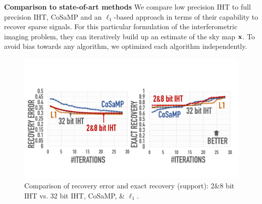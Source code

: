 \documentclass{article}
\begin{document}
{%


{\bf Comparison to state-of-art methods}
We compare low precision IHT to full precision IHT, CoSaMP and an $\ell_1$-based approach in terms of their capability to recover sparse signals. For this particular formulation of the interferometric imaging problem, they can iteratively build up an estimate of the sky map ${\bf x}$. To avoid bias towards any algorithm, we optimized each algorithm independently.

\begin{figure}[t]
\centering
\includegraphics[width=1\columnwidth, angle=0]{figs/comparison1.pdf}
\caption{Comparison of recovery error and exact recovery (support): {2\&8 bit} IHT vs. 32 bit IHT, CoSaMP, \& $\ell_1$.}
\label{fig:comparison}
\vspace{-1em}
\end{figure}

}
\end{document}
